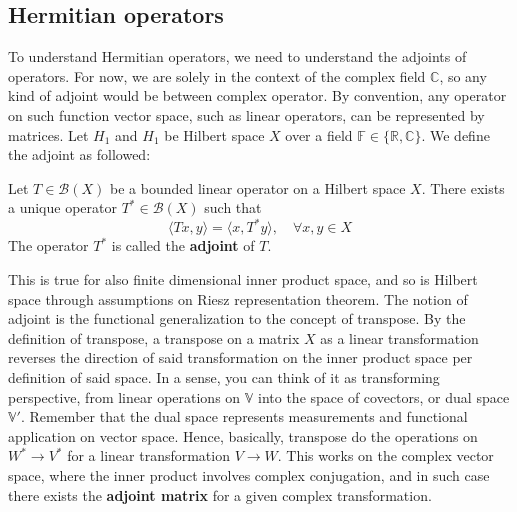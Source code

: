 \subsection{Hermitian operators}

To understand Hermitian operators, we need to understand the adjoints of operators. For now, we are solely in the context of the complex field $\mathbb{C}$, so any kind of adjoint would be between complex operator. By convention, any operator on such function vector space, such as linear operators, can be represented by matrices. Let $H_{1}$ and $H_{1}$ be Hilbert space $X$ over a field $\mathbb{F}\in\{\mathbb{R},\mathbb{C}\}$. We define the adjoint as followed:
\begin{theorem}
    Let $T\in\mathcal{B}(X)$ be a bounded linear operator on a Hilbert space $X$. There exists a unique operator $T^{*}\in\mathcal{B}(X)$ such that 
    \begin{equation}
        \langle T x, y\rangle = \langle x, T^{*}y\rangle, \quad \forall x,y\in X
    \end{equation}
    The operator $T^{*}$ is called the \textbf{adjoint} of $T$. 
\end{theorem}
This is true for also finite dimensional inner product space, and so is Hilbert space through assumptions on Riesz representation theorem. The notion of adjoint is the functional generalization to the concept of transpose. By the definition of transpose, a transpose on a matrix $X$ as a linear transformation reverses the direction of said transformation on the inner product space per definition of said space. In a sense, you can think of it as transforming perspective, from linear operations on $\mathbb{V}$ into the space of covectors, or dual space $\mathbb{V}'$. Remember that the dual space represents measurements and functional application on vector space. Hence, basically, transpose do the operations on $W^{*}\to V^{*}$ for a linear transformation $V\to W$. This works on the complex vector space, where the inner product involves complex conjugation, and in such case there exists the \textbf{adjoint matrix} for a given complex transformation. 

